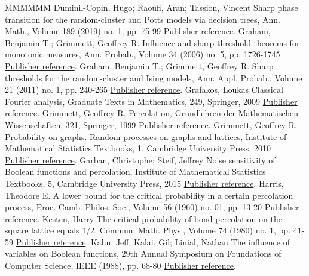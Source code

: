 \documentclass[11pt]{article}
\theoremstyle{definition}
\numberwithin{equation}{section}
\begin{document}
\begin{thebibliography}{MMMMMM}
 Duminil-Copin, Hugo; Raoufi, Aran; Tassion, Vincent Sharp phase transition for the random-cluster and Potts models via decision trees, Ann. Math., Volume 189 (2019) no. 1, pp. 75-99 \href{https://ahl.centre-mersenne.org/item/AHL_2020__3__169_0/#duminil2017sharp}{Publisher reference}.
 Graham, Benjamin T.; Grimmett, Geoffrey R. Influence and sharp-threshold theorems for monotonic measures, Ann. Probab., Volume 34 (2006) no. 5, pp. 1726-1745 \href{https://ahl.centre-mersenne.org/item/AHL_2020__3__169_0/#graham2006influence}{Publisher reference}.
 Graham, Benjamin T.; Grimmett, Geoffrey R. Sharp thresholds for the random-cluster and Ising models, Ann. Appl. Probab., Volume 21 (2011) no. 1, pp. 240-265 \href{https://ahl.centre-mersenne.org/item/AHL_2020__3__169_0/#graham2011sharp}{Publisher reference}.
 Grafakos, Loukas Classical Fourier analysis, Graduate Texts in Mathematics, 249, Springer, 2009 \href{https://ahl.centre-mersenne.org/item/AHL_2020__3__169_0/#grafakos}{Publisher reference}.
 Grimmett, Geoffrey R. Percolation, Grundlehren der Mathematischen Wissenschaften, 321, Springer, 1999 \href{https://ahl.centre-mersenne.org/item/AHL_2020__3__169_0/#grimmett1999percolation}{Publisher reference}.
 Grimmett, Geoffrey R. Probability on graphs. Random processes on graphs and lattices, Institute of Mathematical Statistics Textbooks, 1, Cambridge University Press, 2010 \href{https://ahl.centre-mersenne.org/item/AHL_2020__3__169_0/#grimmett2010probability}{Publisher reference}.
 Garban, Christophe; Steif, Jeffrey Noise sensitivity of Boolean functions and percolation, Institute of Mathematical Statistics Textbooks, 5, Cambridge University Press, 2015 \href{https://ahl.centre-mersenne.org/item/AHL_2020__3__169_0/#garban2014noise}{Publisher reference}.
 Harris, Theodore E. A lower bound for the critical probability in a certain percolation process, Proc. Camb. Philos. Soc., Volume 56 (1960) no. 01, pp. 13-20 \href{https://ahl.centre-mersenne.org/item/AHL_2020__3__169_0/#harris1960lower}{Publisher reference}.
 Kesten, Harry The critical probability of bond percolation on the square lattice equals 1/2, Commun. Math. Phys., Volume 74 (1980) no. 1, pp. 41-59 \href{https://ahl.centre-mersenne.org/item/AHL_2020__3__169_0/#kesten1980critical}{Publisher reference}.
 Kahn, Jeff; Kalai, Gil; Linial, Nathan The influence of variables on Boolean functions, 29th Annual Symposium on Foundations of Computer Science, IEEE (1988), pp. 68-80 \href{https://ahl.centre-mersenne.org/item/AHL_2020__3__169_0/#kahn1988influence}{Publisher reference}.

\end{thebibliography}
\end{document}
